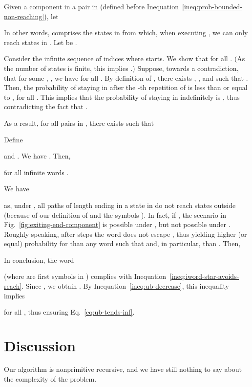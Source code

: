 \documentclass[final,3p,times,twocolumn]{elsarticle}
\theoremstyle{plain}
\theoremstyle{definition}
\newcommand{\recallEquation}[1]{Eq.~\ref{#1}}
\newcommand{\recallInequation}[1]{Inequation~\ref{#1}}
\newcommand{\recallFigure}[1]{Fig.~\ref{#1}}
\begin{document}
Given a component  in a pair in  (defined before
\recallInequation{ineq:prob-bounded-non-reaching}), let

In other words,  comprises the states in  from
which, when executing , we can only reach states
in . Let  be .

Consider the infinite sequence
 of indices where  starts. We show that
 for all
. (As the number of states is finite, this implies
.)
Suppose, towards a contradiction, that for some , ,
we have  for all . By definition of
, there exists , , and  such that
. Then, the
probability of staying in  after the -th repetition of  is
less than or equal to , for all . This implies that the
probability of staying in  indefinitely is , thus contradicting the fact
that .

As a result, for all pairs  in , there exists
 such that

Define

and 
.
We have
.
Then,

for all infinite words .

We have

as, under , all paths of length  ending in a state in
 do not reach states outside  (because of our definition of 
and the symbols ). In fact, if , the
scenario in \recallFigure{fig:exiting-end-component} is possible under
, but not possible under . Roughly speaking, after 
steps the word  does not escape , thus yielding higher
(or equal) probability for  than any word  such that
 and, in particular, than
. Then,

In conclusion, the word

(where  are first
 symbols in ) complies with
\recallInequation{ineq:iword-star-avoids-reach}. Since
, we obtain
. By
\recallInequation{ineq:ub-decrease}, this inequality implies

for all , thus ensuring \recallEquation{eq:ub-tends-inf}.

\section{Discussion}

Our algorithm is nonprimitive recursive, and we have still nothing to say
about the complexity of the problem.
\end{document}

